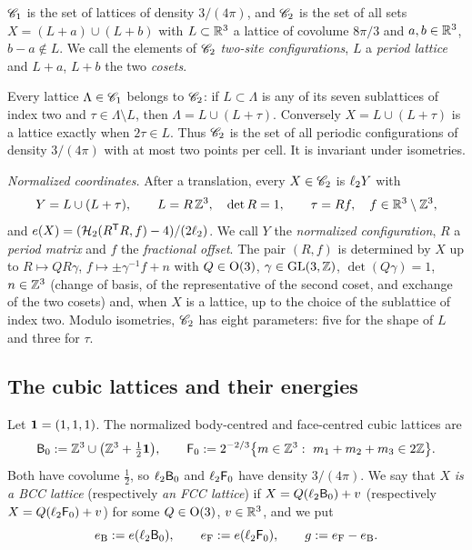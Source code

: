 \begin{definition}\label{def:class}
$\mathscr C_1$ is the set of lattices of density $3/(4\pi)$, and $\mathscr C_2$ is the set of all sets $X=(L+a)\cup(L+b)$ with $L\subset\mathbb R^3$ a lattice
of covolume $8\pi/3$ and $a,b\in\mathbb R^3$, $b-a\notin L$. We call the elements of $\mathscr C_2$ \emph{two-site configurations}, $L$ a \emph{period
lattice} and $L+a$, $L+b$ the two \emph{cosets}.
\end{definition}

Every lattice $\Lambda\in\mathscr C_1$ belongs to $\mathscr C_2$: if $L\subset\Lambda$ is any of its seven sublattices of index two and
$\tau\in\Lambda\setminus L$, then $\Lambda=L\cup(L+\tau)$. Conversely $X=L\cup(L+\tau)$ is a lattice exactly when $2\tau\in L$. Thus
$\mathscr C_2$ is the set of all periodic configurations of density $3/(4\pi)$ with at most two points per cell. It is invariant under
isometries.

\emph{Normalized coordinates.} After a translation, every $X\in\mathscr C_2$ is $\ell_2 Y$ with
\begin{equation}\label{eq:Ynorm}
  Y=L\cup(L+\tau),\qquad L=R\,\mathbb Z^3,\quad \det R=1,\qquad \tau=Rf,\quad f\in\mathbb R^3\setminus\mathbb Z^3 ,
\end{equation}
and $e(X)=(\mathcal H_2(R^\mathsf T R,f)-4)/(2\ell_2)$. We call $Y$ the \emph{normalized configuration}, $R$ a \emph{period matrix} and $f$ the
\emph{fractional offset}. The pair $(R,f)$ is determined by $X$ up to $R\mapsto QR\gamma$, $f\mapsto\pm\gamma^{-1}f+n$ with $Q\in\mathrm{O}(3)$,
$\gamma\in\mathrm{GL}(3,\mathbb Z)$, $\det(Q\gamma)=1$, $n\in\mathbb Z^3$ (change of basis, of the representative of the second coset, and exchange of the two cosets) and, when
$X$ is a lattice, up to the choice of the sublattice of index two. Modulo isometries, $\mathscr C_2$ has eight parameters: five for the shape
of $L$ and three for $\tau$.

\subsection{The cubic lattices and their energies}\label{ssec:constants}

Let $\mathbf 1=(1,1,1)$. The normalized body-centred and face-centred cubic lattices are
\begin{equation}\label{eq:B0F0}
  \mathsf B_0:=\mathbb Z^3\cup\bigl(\mathbb Z^3+\tfrac12\mathbf 1\bigr),\qquad \mathsf F_0:=2^{-2/3}\bigl\{m\in\mathbb Z^3:\ m_1+m_2+m_3\in2\mathbb Z\bigr\} .
\end{equation}
Both have covolume $\frac12$, so $\ell_2\mathsf B_0$ and $\ell_2\mathsf F_0$ have density $3/(4\pi)$. We say that $X$ \emph{is a BCC lattice} (respectively
\emph{an FCC lattice}) if $X=Q(\ell_2\mathsf B_0)+v$ (respectively $X=Q(\ell_2\mathsf F_0)+v$) for some $Q\in\mathrm{O}(3)$, $v\in\mathbb R^3$, and we put
\[
  e_{\mathrm B}:=e(\ell_2\mathsf B_0),\qquad e_{\mathrm F}:=e(\ell_2\mathsf F_0),\qquad g:=e_{\mathrm F}-e_{\mathrm B} .
\]

